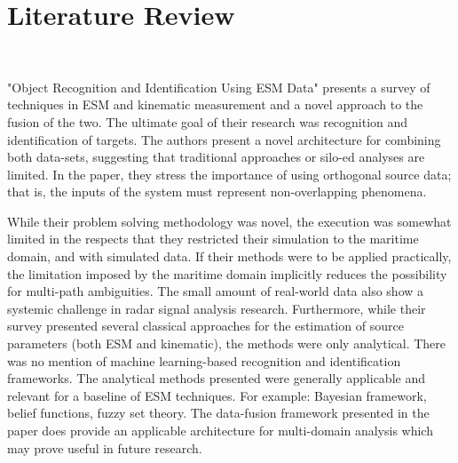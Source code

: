 \section{Literature Review}~\label{sec:literature}

"Object Recognition and Identification Using ESM Data" \cite{taghavi_object_2016} presents a survey of techniques in ESM and kinematic measurement and a novel approach to the fusion of the two. The ultimate goal of their research was recognition and identification of targets. The authors present a novel architecture for combining both data-sets, suggesting that traditional approaches or silo-ed analyses are limited. In the paper, they stress the importance of using orthogonal source data; that is, the inputs of the system must represent non-overlapping phenomena. 

While their problem solving methodology was novel, the execution was somewhat limited in the respects that they restricted their simulation to the maritime domain, and with simulated data. If their methods were to be applied practically, the limitation imposed by the maritime domain implicitly reduces the possibility for multi-path ambiguities. The small amount of real-world data also show a systemic challenge in radar signal analysis research. Furthermore, while their survey presented several classical approaches for the estimation of source parameters (both ESM and kinematic), the methods were only analytical. There was no mention of machine learning-based recognition and identification frameworks. The analytical methods presented were generally applicable and relevant for a baseline of ESM techniques. For example: Bayesian framework, belief functions, fuzzy set theory. The data-fusion framework presented in the paper does provide an applicable architecture for multi-domain analysis which may prove useful in future research. %

